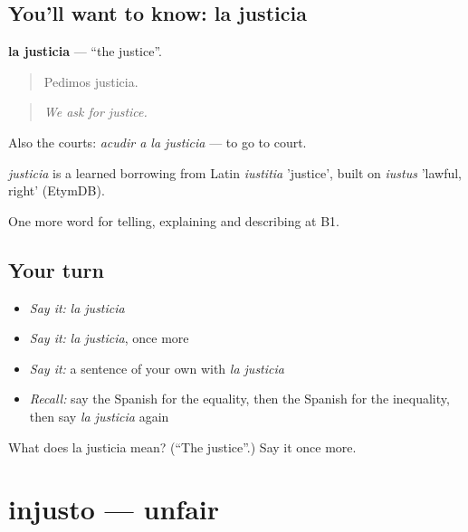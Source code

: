 \subsection*{You'll want to know: la justicia}
\textbf{la justicia} — \textquotedblleft{}the justice\textquotedblright{}.

\begin{quote}
Pedimos justicia.
\end{quote}

\begin{quote}
\emph{We ask for justice.}
\end{quote}

Also the courts: \emph{acudir a la justicia} — to go to court.

\begin{cousinweb}
\emph{justicia} is a learned borrowing from Latin \emph{iustitia} 'justice', built on \emph{iustus} 'lawful, right' (EtymDB).
\end{cousinweb}

\begin{grammarlens}[title={What you've built}]
One more word for telling, explaining and describing at B1.
\end{grammarlens}

\subsection*{Your turn}
\begin{itemize}
\raggedright
  \item \emph{Say it:} \emph{la justicia}
  \item \emph{Say it:} \emph{la justicia}, once more
  \item \emph{Say it:} a sentence of your own with \emph{la justicia}
  \item \emph{Recall:} say the Spanish for the equality, then the Spanish for the inequality, then say \emph{la justicia} again
\end{itemize}

\begin{tcolorbox}[breakable,colback=teal!4,colframe=teal!35!black,title={Before you move on}]
What does la justicia mean? (\textquotedblleft{}The justice\textquotedblright{}.) Say it once more.
\end{tcolorbox}
\section[injusto]{injusto — unfair}

